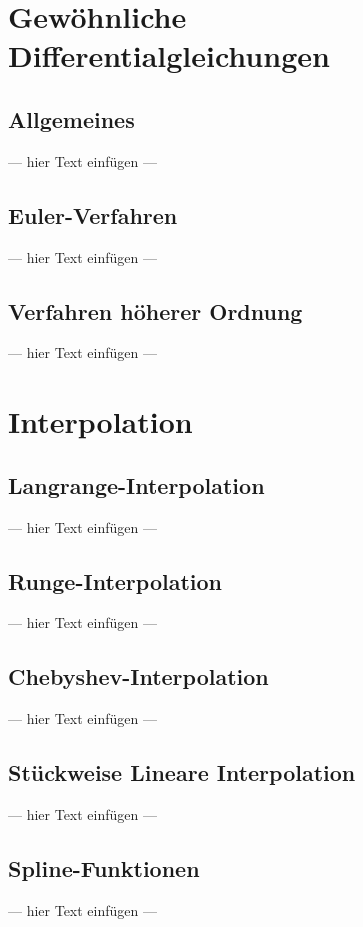 \documentclass[a4paper, 12pt]{article}
\begin{document}
\begin{description}
\section{Gewöhnliche Differentialgleichungen}


\subsection{Allgemeines}
--- hier Text einfügen ---


\subsection{Euler-Verfahren}
--- hier Text einfügen ---


\subsection{Verfahren höherer Ordnung}
--- hier Text einfügen ---



\section{Interpolation}


\subsection{Langrange-Interpolation}
--- hier Text einfügen ---


\subsection{Runge-Interpolation}
--- hier Text einfügen ---


\subsection{Chebyshev-Interpolation}
--- hier Text einfügen ---


\subsection{Stückweise Lineare Interpolation}
--- hier Text einfügen ---


\subsection{Spline-Funktionen}
--- hier Text einfügen ---




\end{description}
\end{document}
